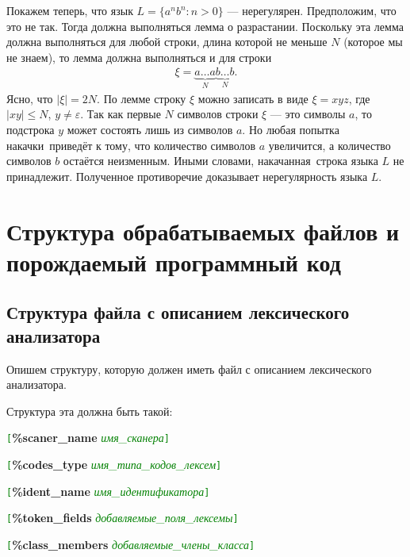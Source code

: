 \documentclass[10pt]{report}
\begin{document}
Покажем теперь, что язык $L=\{a^nb^n:n>0\}$ --- нерегулярен. Предположим, что это не так. Тогда должна выполняться лемма о разрастании. Поскольку эта лемма должна выполняться для любой строки, длина которой не меньше $N$ (которое мы не знаем), то лемма должна выполняться и для строки
\begin{gather*}
\xi=\underbrace{a\dots a}_{N}\underbrace{b\dots b}_{N}.
\end{gather*}
Ясно, что $|\xi|=2N$. По лемме строку $\xi$ можно записать в виде $\xi=xyz$, где $|xy|\leqslant N$, $y\neq\varepsilon$. Так как первые $N$ символов строки $\xi$ --- это
символы $a$, то подстрока $y$ может состоять лишь из символов $a$. Но любая попытка \glqq накачки\grqq\ приведёт к тому, что количество символов $a$ увеличится, а количество
символов $b$ остаётся неизменным. Иными словами, \glqq накачанная\grqq\ строка языка $L$ не принадлежит. Полученное противоречие доказывает нерегулярность языка $L$.

\chapter{Структура обрабатываемых файлов и порождаемый программный код}
	\section{Структура файла с описанием лексического анализатора}
	
	
	
Опишем структуру, которую должен иметь файл с описанием лексического анализатора.

Структура эта должна быть такой:

\noindent%
\texttt{\textcolor{Green}{[}}\textbf{\%scaner_name} \textcolor{Green}{\textit{имя_сканера}}\texttt{\textcolor{Green}{]}}

\noindent%
\texttt{\textcolor{Green}{[}}\textbf{\%codes_type} \textcolor{Green}{\textit{имя_типа_кодов_лексем}}\texttt{\textcolor{Green}{]}}

\noindent%
\texttt{\textcolor{Green}{[}}\textbf{\%ident_name} \textcolor{Green}{\textit{имя_идентификатора}}\texttt{\textcolor{Green}{]}}

\noindent%
\texttt{\textcolor{Green}{[}}\textbf{\%token_fields} \textcolor{Green}{\textit{добавляемые_поля_лексемы}}\texttt{\textcolor{Green}{]}}

\noindent%
\texttt{\textcolor{Green}{[}}\textbf{\%class_members} \textcolor{Green}{\textit{добавляемые_члены_класса}}\texttt{\textcolor{Green}{]}}
\end{document}
